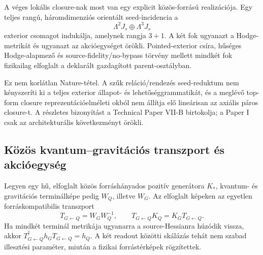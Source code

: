 \documentclass[12pt]{article}
\begin{document}
A véges lokális closure-nak most van egy explicit közös-forrású realizációja.
Egy teljes rangú, háromdimenziós orientált seed-incidencia a
\[
 \Lambda^2J_s\oplus\Lambda^3J_s
\]
exterior csomagot indukálja, amelynek rangja $3+1$.  A két fok ugyanazt a
Hodge-metrikát és ugyanazt az akcióegységet örökli.  Pointed-exterior csíra,
hűséges Hodge-alapmező és source-fidelity/no-bypass törvény mellett mindkét fok
fizikailag elfoglalt a deklarált gazdagított parent-osztályban.

Ez nem korlátlan Nature-tétel.  A szűk reláció/rendezés seed-reduktum nem
kényszeríti ki a teljes exterior állapot- és lehetőséggrammatikát, és a meglévő
top-form closure reprezentációelméleti okból nem állítja elő lineárisan az
axiális páros closure-t.  A részletes bizonyítást a Technical Paper VII-B
birtokolja; a Paper I csak az architekturális következményt örökli.

\subsection{Közös kvantum--gravitációs transzport és akcióegység}

Legyen egy hű, elfoglalt közös forráshányados pozitív generátora $K_*$,
kvantum- és gravitációs terminálképe pedig $W_Q$, illetve $W_G$.  Az elfoglalt
képeken az egyetlen forráskompatibilis transzport
\[
 T_{G\leftarrow Q}=W_GW_Q^{-1},\qquad
 T_{G\leftarrow Q}K_Q=K_GT_{G\leftarrow Q}.
\]
Ha mindkét terminál metrikája ugyanarra a source-Hessianra húzódik vissza,
akkor $T_{G\leftarrow Q}^\dagger h_GT_{G\leftarrow Q}=h_Q$.  A két readout
közötti skálázás tehát nem szabad illesztési paraméter, miután a fizikai
forrástérképek rögzítettek.
\end{document}
